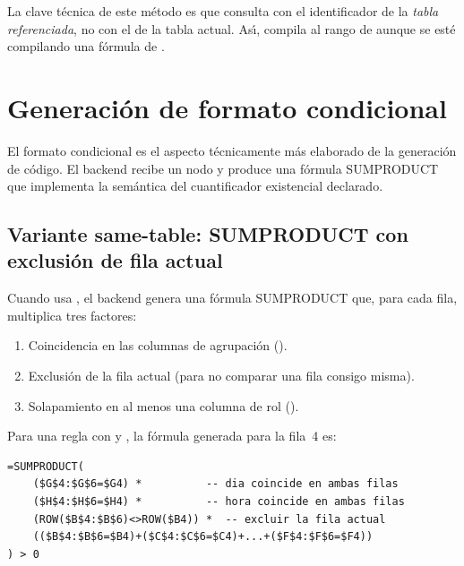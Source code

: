 La clave t\'ecnica de este m\'etodo es que consulta 
con el identificador de la \emph{tabla referenciada}, no con el de la tabla
actual.  As\'{\i},  compila al
rango de  aunque se est\'e compilando una f\'ormula de
.

\section{Generaci\'on de formato condicional}
\label{sec:cf-generacion}

El formato condicional es el aspecto t\'ecnicamente m\'as elaborado de la
generaci\'on de c\'odigo.  El backend recibe un nodo  y
produce una f\'ormula SUMPRODUCT que implementa la sem\'antica del
cuantificador existencial declarado.

\subsection{Variante same-table: SUMPRODUCT con exclusi\'on de fila actual}
\label{ssec:cf-same-table}

Cuando  usa , el backend genera una f\'ormula
SUMPRODUCT que, para cada fila, multiplica tres factores:
\begin{enumerate}
  \item Coincidencia en las columnas de agrupaci\'on ().
  \item Exclusi\'on de la fila actual (para no comparar una fila consigo misma).
  \item Solapamiento en al menos una columna de rol ().
\end{enumerate}

Para una regla con  y
, la f\'ormula generada para
la fila~4 es:

\begin{lstlisting}[style=pythonstyle,
  caption={F\'ormula Excel CF para la variante same-table (fila 4).}]
=SUMPRODUCT(
    ($G$4:$G$6=$G4) *          -- dia coincide en ambas filas
    ($H$4:$H$6=$H4) *          -- hora coincide en ambas filas
    (ROW($B$4:$B$6)<>ROW($B4)) *  -- excluir la fila actual
    (($B$4:$B$6=$B4)+($C$4:$C$6=$C4)+...+($F$4:$F$6=$F4))
) > 0
\end{lstlisting}

